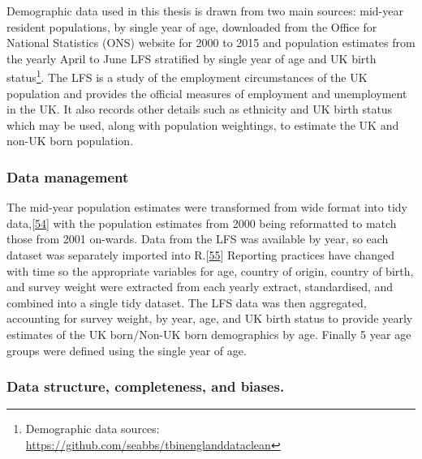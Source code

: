 \documentclass[11pt,twoside]{bristolthesis}
\begin{document}
  Demographic data used in this thesis is drawn from two main sources: mid-year resident populations, by single year of age, downloaded from the Office for National Statistics (ONS) website for 2000 to 2015 and population estimates from the yearly April to June LFS stratified by single year of age and UK birth status\footnote{Demographic data sources: \url{https://github.com/seabbs/tbinenglanddataclean}}. The LFS is a study of the employment circumstances of the UK population and provides the official measures of employment and unemployment in the UK. It also records other details such as ethnicity and UK birth status which may be used, along with population weightings, to estimate the UK and non-UK born population.
  
  \hypertarget{data-management}{%
  \subsubsection{Data management}\label{data-management}}
  
  The mid-year population estimates were transformed from wide format into tidy data,{[}\protect\hyperlink{ref-Wickham2015}{54}{]} with the population estimates from 2000 being reformatted to match those from 2001 on-wards. Data from the LFS was available by year, so each dataset was separately imported into R.{[}\protect\hyperlink{ref-R}{55}{]} Reporting practices have changed with time so the appropriate variables for age, country of origin, country of birth, and survey weight were extracted from each yearly extract, standardised, and combined into a single tidy dataset. The LFS data was then aggregated, accounting for survey weight, by year, age, and UK birth status to provide yearly estimates of the UK born/Non-UK born demographics by age. Finally 5 year age groups were defined using the single year of age.
  
  \hypertarget{data-structure-completeness-and-biases.}{%
  \subsubsection{Data structure, completeness, and biases.}\label{data-structure-completeness-and-biases.}}
  
\end{document}
